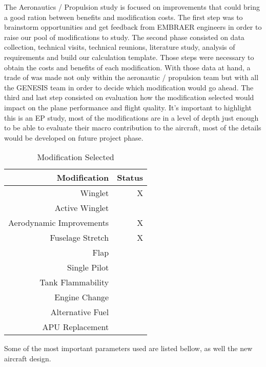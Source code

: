 The Aeronautics / Propulsion study is focused on improvements that could bring a good ration between benefits and modification costs. The first step was to brainstorm opportunities and get feedback from EMBRAER engineers in order to raise our pool of modifications to study.
The second phase consisted on data collection, technical visits, technical reunions, literature study, analysis of requirements and build our calculation template. Those steps were necessary to obtain the costs and benefits of each modification. With those data at hand, a trade of was made not only within the aeronautic / propulsion team but with all the GENESIS team in order to decide which modification would go ahead.
The third and last step consisted on evaluation how the modification selected would impact on the plane performance and flight quality.
It's important to highlight this is an EP study, most of the modifications are in a level of depth just enough to be able to evaluate their macro contribution to the aircraft, most of the details would be developed on future project phase.

\begin{table}[htbp]
  \centering
  \caption{Modification Selected}
    \begin{tabular}{rr}
    \toprule
    Modification & Status \\
    \midrule
    Winglet & X  \\
    Active Winglet &  \\
    Aerodynamic Improvements & X \\
    Fuselage Stretch & X \\
    Flap  &  \\
    Single Pilot &  \\
    Tank Flammability &  \\
    Engine Change &  \\
    Alternative Fuel &  \\
    APU Replacement &  \\
    \bottomrule
    \end{tabular}%
  \label{tab:Modification Selected}%
\end{table}%

Some of the most important parameters used are listed bellow, as well the new aircraft design.


\begin{figure}[H] %
\label{tab:larissa1}
\end{figure}

